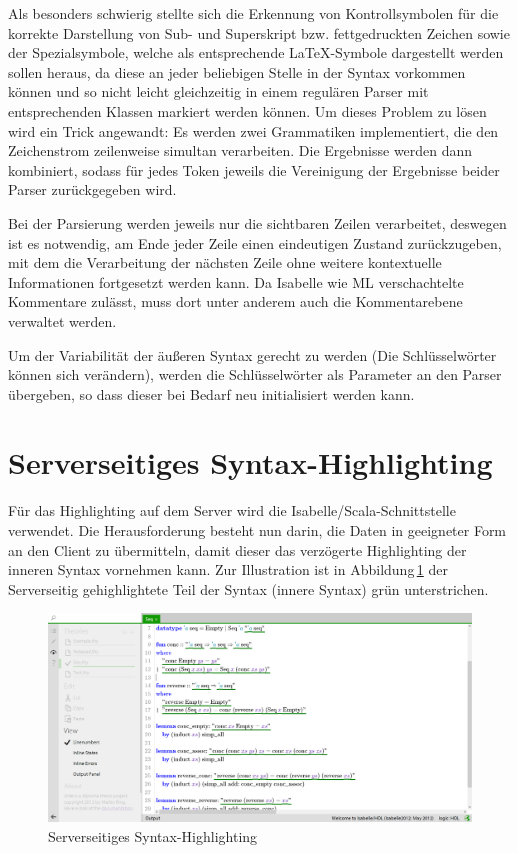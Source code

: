 Als besonders schwierig stellte sich die Erkennung von Kontrollsymbolen für die korrekte Darstellung
von Sub- und Superskript bzw. fettgedruckten Zeichen sowie der Spezialsymbole, welche als
entsprechende \LaTeX-Symbole dargestellt werden sollen heraus, da diese an jeder beliebigen Stelle
in der Syntax vorkommen können und so nicht leicht gleichzeitig in einem regulären Parser mit
entsprechenden Klassen markiert werden können. Um dieses Problem zu lösen wird ein Trick angewandt:
Es werden zwei Grammatiken implementiert, die den Zeichenstrom zeilenweise simultan verarbeiten.
Die Ergebnisse werden dann kombiniert, sodass für jedes Token jeweils die Vereinigung der Ergebnisse
beider Parser zurückgegeben wird.

Bei der Parsierung werden jeweils nur die sichtbaren Zeilen verarbeitet, deswegen ist es notwendig,
am Ende jeder Zeile einen eindeutigen Zustand zurückzugeben, mit dem die Verarbeitung der nächsten
Zeile ohne weitere kontextuelle Informationen fortgesetzt werden kann. Da Isabelle wie ML
verschachtelte Kommentare zulässt, muss dort unter anderem auch die Kommentarebene verwaltet werden.

Um der Variabilität der äußeren Syntax gerecht zu werden (Die Schlüsselwörter können sich
verändern), werden die Schlüsselwörter als Parameter an den Parser übergeben, so dass dieser bei
Bedarf neu initialisiert werden kann.

\section{Serverseitiges Syntax-Highlighting}
\label{sec:ssyntax}

Für das Highlighting auf dem Server wird die Isabelle/Scala-Schnittstelle verwendet. Die
Herausforderung besteht nun darin, die Daten in geeigneter Form an den Client zu übermitteln, damit
dieser das verzögerte Highlighting der inneren Syntax vornehmen kann. Zur Illustration ist in
Abbildung\,\ref{fig:sssyntax} der Serverseitig gehighlightete Teil der Syntax (innere Syntax)
grün unterstrichen.

\begin{figure}[ht]
\includegraphics[width=\linewidth]{images/sssyntax}
  \caption{Serverseitiges Syntax-Highlighting}
  \label{fig:sssyntax}
\end{figure}

